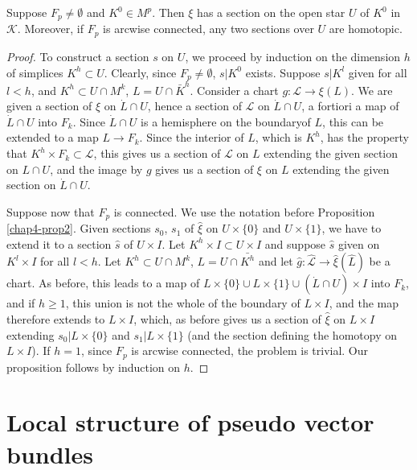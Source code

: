 \begin{proposition}\label{chap4-prop3} %
Suppose $F_{p}\neq \emptyset$ and $K^{0}\in M^{p}$. Then $\xi$ has a
section on the open star $U$ of $K^{0}$ in $\mathscr{K}$. Moreover, if
$F_{p}$ is arcwise connected, any two sections over $U$ are homotopic.
\end{proposition}

\begin{proof} %
To construct a section $s$ on $U$, we proceed by induction on the
dimension $h$ of simplices $K^{h}\subset U$. Clearly, since $F_{p}\neq
\emptyset$, $s|K^{0}$ exists. Suppose $s|K^{l}$ given for all $l<h$,
and $K^{h}\subset U\cap M^{k}$, $L=U\cap \bar{K}^{h}$. Consider a
chart $g:\mathscr{L}\to \xi(L)$. We are given a section of $\xi$ on
$\dot{L}\cap U$, hence a section of $\mathscr{L}$ on $\dot{L}\cap U$,
a fortiori  a map of $\dot{L}\cap U$ into $F_{k}$. Since $\dot{L}\cap
U$ is a hemisphere on the boundary\pageoriginale of $L$, this can be
extended to a map $L\to F_{k}$. Since the interior of $L$, which is
$K^{h}$, has the property that $K^{h}\times F_{k}\subset \mathscr{L}$,
this gives us a section of $\mathscr{L}$ on $L$ extending the given
section on $L\cap U$, and the image by $g$ gives us a section of $\xi$
on $L$ extending the given section on $\dot{L}\cap U$.

Suppose now that $F_{p}$ is connected. We use the notation before
Proposition \ref{chap4-prop2}. Given sections $s_{0}$, $s_{1}$ of
$\widehat{\xi}$ on $U\times\{0\}$ and $U\times\{1\}$, we have to
extend it to a section $\widehat{s}$ of $U\times I$. Let $K^{h}\times
I\subset U\times I$ and suppose $\widehat{s}$ given on $K^{l}\times I$
for all $l<h$. Let $K^{h}\subset U\cap M^{k}$, $L=U\cap \bar{K^{h}}$
and let $\widehat{g}:\widehat{\mathscr{L}}\to
\widehat{\xi}(\widehat{L})$ be a chart. As before, this leads to a map
of $L\times \{0\}\cup L\times\{1\}\cup (\dot{L}\cap U)\times I$ into
$F_{k}$, and if $h\geq 1$, this union is not the whole of the boundary
of $L\times I$, and the map therefore extends to $L\times I$, which,
as before gives us a section of $\widehat{\xi}$ on $L\times I$
extending $s_{0}|L\times\{0\}$ and $s_{1}|L\times \{1\}$ (and the
section defining the homotopy on $L\times I$). If $h=1$, since $F_{p}$
is arcwise connected, the problem is trivial. Our proposition follows
by induction on $h$. 
\end{proof}

\section{Local structure of pseudo vector bundles}\label{chap4-sec3}

